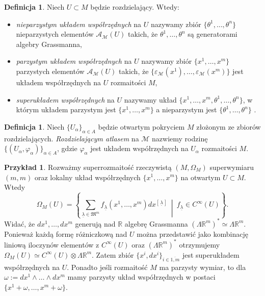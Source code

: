 \documentclass[11pt,a4paper]{report}
\theoremstyle{definition}
\newtheorem{example}[theorem]{Przykład}
\newtheorem{definition}[theorem]{Definicja}
\begin{document}
\begin{definition}
Niech $U \subset M$ będzie rozdzielający. Wtedy:
\begin{itemize}
 \item {}\textit{nieparzystym układem współrzędnych} na $U$ nazywamy zbiór $\{\theta^1, \ldots, \theta^n \}$ nieparzystych elementów $\mathcal{A}_\mathcal{M} (U)$ takich, że $\theta^1, \ldots, \theta^n$ są generatorami algebry Grassmanna,
 \item {}\textit{parzystym układem współrzędnych} na $U$ nazywamy zbiór $\{x^1, \ldots, x^m \}$ parzystych elementów $\mathcal{A}_\mathcal{M} (U)$ takich, że $\{ \varepsilon_\mathcal{M} (x^1), \ldots, \varepsilon_\mathcal{M} (x^m) \}$ jest układem współrzędnych na $U$ rozmaitości $M$,
 \item {}\textit{superukładem współrzędnych} na $U$ nazywamy układ $\{x^1, \ldots, x^m, \theta^1, \ldots, \theta^n \}$, w którym układem parzystym jest $\{x^1, \ldots, x^m \}$ a nieparzystym jest $\{\theta^1, \ldots, \theta^n \}$ \cite{rogers}.
\end{itemize}
\end{definition}

\begin{definition}
 Niech $\{ U_\alpha \}_{\alpha \in A}$ będzie otwartym pokryciem $M$ złożonym ze zbiorów rozdzielających. \textit{Rozdzielającym atlasem} na $\mathcal{M}$ nazwiemy rodzinę $\{ (U_\alpha, \varphi_\alpha) \}_{\alpha \in A}$, gdzie $\varphi_\alpha$ jest układem współrzędnych na $U_\alpha$ rozmaitości $M$.
\end{definition}

\begin{example}
Rozważmy superrozmaitość rzeczywistą $(M, \Omega_M)$ superwymiaru $(m,m)$ oraz lokalny układ współrzędnych $\{x^1, \ldots, x^m \}$ na otwartym $U \subset M$. Wtedy
\begin{equation*}
\Omega_M(U) = \left\{ \sum_{\underline{\lambda} \in \mathfrak{M}^m} f_{\underline{\lambda}} (x^1,\ldots,x^m)dx^{\left[ \, \underline{\lambda} \, \right]} \ \middle|\ f_{\underline{\lambda}} \in C^\infty(U) \right\}.
\end{equation*}
Widać, że $dx^1, \ldots, dx^m$ generują nad $\mathbb{R}$ algebrę Grassmanna $(\Lambda \mathbb{R}^m)^* \simeq \Lambda \mathbb{R}^m$. Ponieważ każdą formę różniczkową nad $U$ można przedstawić jako kombinację liniową iloczynów elementów z $C^{\infty}(U)$ oraz $(\Lambda \mathbb{R}^m)^*$ otrzymujemy $\Omega_M(U) \simeq C^{\infty}(U) \otimes \Lambda \mathbb{R}^m$. Zatem zbiór $\{ x^i, dx^i \}_{i \in \overline{1,m}}$ jest superukładem współrzędnych na $U$. Ponadto jeśli rozmaitość $M$ ma parzysty wymiar, to dla $\omega := dx^1 \wedge \ldots \wedge dx^m$ mamy parzysty układ współrzędnych w postaci $\{x^1 + \omega, \ldots, x^m +\omega \}$.
\end{example}
\end{document}
